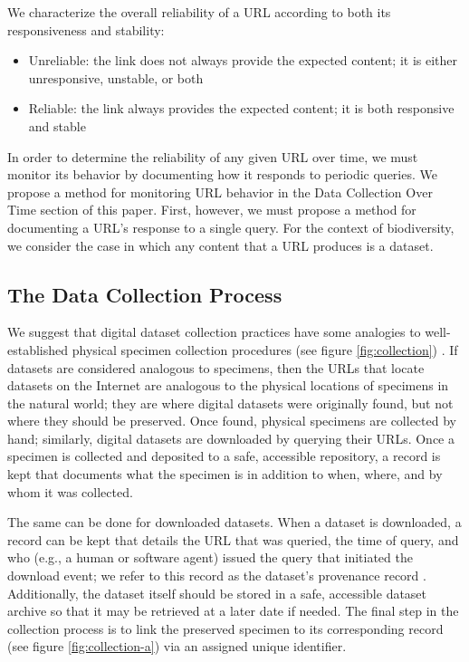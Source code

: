 We characterize the overall reliability of a URL according to both its responsiveness and stability:

\begin{itemize}
 \item Unreliable: the link does not always provide the expected content; it is either unresponsive, unstable, or both
 \item Reliable: the link always provides the expected content; it is both responsive and stable
\end{itemize}

In order to determine the reliability of any given URL over time, we must monitor its behavior by documenting how it responds to periodic queries. We propose a method for monitoring URL behavior in the Data Collection Over Time section of this paper. First, however, we must propose a method for documenting a URL's response to a single query. For the context of biodiversity, we consider the case in which any content that a URL produces is a dataset.

\subsection*{The Data Collection Process}
We suggest that digital dataset collection practices have some analogies to well-established physical specimen collection procedures (see figure \ref{fig:collection}) \citep{Poelen_2019}. If datasets are considered analogous to specimens, then the URLs that locate datasets on the Internet are analogous to the physical locations of specimens in the natural world; they are where digital datasets were originally found, but not where they should be preserved. Once found, physical specimens are collected by hand; similarly, digital datasets are downloaded by querying their URLs. Once a specimen is collected and deposited to a safe, accessible repository, a record is kept that documents what the specimen is in addition to when, where, and by whom it was collected.



The same can be done for downloaded datasets. When a dataset is downloaded, a record can be kept that details the URL that was queried, the time of query, and who (e.g., a human or software agent) issued the query that initiated the download event; we refer to this record as the dataset's provenance record \citep{Pasquier_2017}. Additionally, the dataset itself should be stored in a safe, accessible dataset archive so that it may be retrieved at a later date if needed. The final step in the collection process is to link the preserved specimen to its corresponding record (see figure \ref{fig:collection-a}) via an assigned unique identifier.

